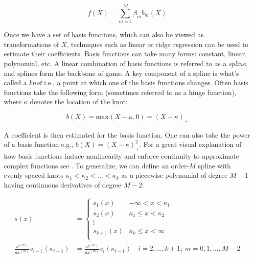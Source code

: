 \documentclass{report}
\begin{document}
\begin{equation}\label{eq:glm-gam-basis-functions}
    f(X) = \sum_{m=1}^M \beta_m b_m(X)
\end{equation}

Once we have a set of basis functions, which can also be viewed as transformations of $X$, techniques such as linear or ridge regression can be used to estimate their coefficients. Basis functions can take many forms: constant, linear, polynomial, etc. A linear combination of basis functions is referred to as a \textit{spline}, and splines form the backbone of \glspl{gam}. A key component of a spline is what's called a \textit{knot} i.e., a point at which one of the basis functions changes. Often basis functions take the following form (sometimes referred to as a hinge function), where $\kappa$ denotes the location of the knot:

\begin{equation}\label{eq:glm-gam-hinge-function}
    b(X) = \text{max}(X - \kappa, 0) = (X - \kappa)_+
\end{equation}

A coefficient is then estimated for the basis function. One can also take the power of a basis function e.g., $b(X) = (X - \kappa)_+^2$. For a great visual explanation of how basis functions induce nonlinearity and enforce continuity to approximate complex functions see \cite[Lecture~6]{molstad_sta_2022}. To generalize, we can define an order-$M$ spline with evenly-spaced knots $\kappa_1 < \kappa_2 < \dots < \kappa_k$ as a piecewise polynomial of degree $M-1$ having continuous derivatives of degree $M-2$:

\begin{equation}\label{eq:glm-gam-order-m-spline}
    \begin{aligned}
        s(x) &= \begin{cases}
            s_1(x) & -\infty < x < \kappa_1 \\
            s_2(x) & \kappa_1 \le x < \kappa_2 \\
            \vdots & \\
            s_{k+1}(x) & \kappa_k \le x < \infty \\
        \end{cases} \\
        \frac{d^{(m)}}{dx^{(m)}} s_{i-1}(\kappa_{i-1}) &= \frac{d^{(m)}}{dx^{(m)}} s_i(\kappa_{i-1}) \quad i = 2, \dots, k+1; \: m = 0, 1, \dots, M-2 \\
    \end{aligned}
\end{equation}
\end{document}
